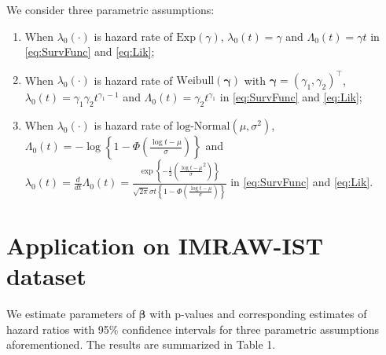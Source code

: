 \documentclass[11pt]{article}
\newcommand{\bbeta}{{\bm \beta}}
\newcommand{\bgamma}{{\bm \gamma}}
\begin{document}
We consider three parametric assumptions:

\begin{enumerate}
\item When $\lambda_0(\cdot)$ is hazard rate of $\text{Exp}(\gamma)$, 
  $\lambda_0(t)=\gamma$ and $\Lambda_0(t)=\gamma t$ in \eqref{eq:SurvFunc} and \eqref{eq:Lik};
\item When $\lambda_0(\cdot)$ is hazard rate of $\text{Weibull}(\bgamma)$ with
  $\bgamma=(\gamma_1,\gamma_2)^{\top}$, $\lambda_0(t)=\gamma_1\gamma_2
  t^{\gamma_1 - 1}$ and $\Lambda_0(t) = \gamma_2 t^{\gamma_1}$ in \eqref{eq:SurvFunc} and \eqref{eq:Lik};
\item When $\lambda_0(\cdot)$ is hazard rate of
  $\text{log-Normal}(\mu,\sigma^2)$, $\Lambda_0(t) = -\log \left\{ 1- \Phi
    \left( \frac{\log t - \mu}{\sigma} \right)\right\}$ and $\lambda_0(t) =
  \frac{d}{dt}\Lambda_0(t) = \frac{\exp \left\{ -\frac{1}{2} \left( \frac{\log t
      - \mu}{\sigma}^2 \right)\right\}}{\sqrt{2\pi}\sigma t \left\{ 1-\Phi \left(
      \frac{\log t - \mu}{\sigma} \right) \right\}}$ in \eqref{eq:SurvFunc} and \eqref{eq:Lik}.
\end{enumerate}

\section{Application on IMRAW-IST dataset}
We estimate parameters of $\bbeta$ with p-values and corresponding estimates of
hazard ratios with 95\% confidence intervals for three parametric assumptions
aforementioned. The results are summarized in Table 1.
\end{document}
